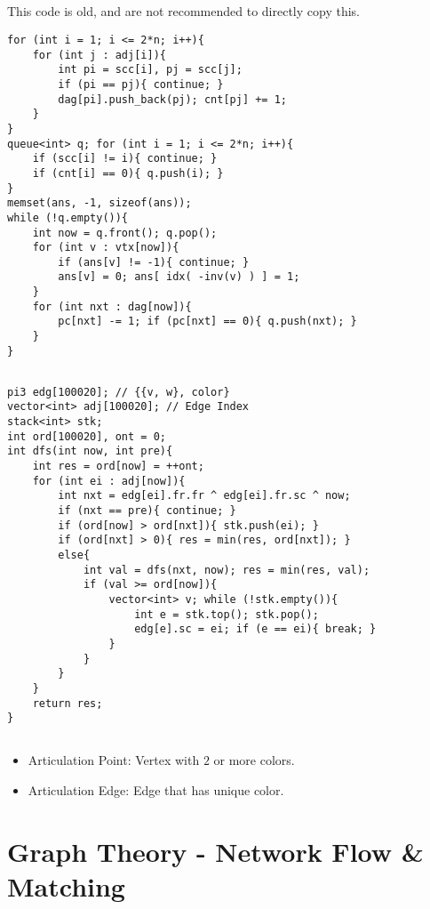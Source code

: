 \documentclass[landscape, 8pt, a4paper, oneside, twocolumn]{extarticle}
\begin{document}
\subsection{}
This code is old, and are not recommended to directly copy this.
\begin{verbatim}
for (int i = 1; i <= 2*n; i++){
    for (int j : adj[i]){
        int pi = scc[i], pj = scc[j];
        if (pi == pj){ continue; }
        dag[pi].push_back(pj); cnt[pj] += 1;
    }
}
queue<int> q; for (int i = 1; i <= 2*n; i++){
    if (scc[i] != i){ continue; }
    if (cnt[i] == 0){ q.push(i); }
}
memset(ans, -1, sizeof(ans));
while (!q.empty()){
    int now = q.front(); q.pop();
    for (int v : vtx[now]){
        if (ans[v] != -1){ continue; }
        ans[v] = 0; ans[ idx( -inv(v) ) ] = 1;
    }
    for (int nxt : dag[now]){
        pc[nxt] -= 1; if (pc[nxt] == 0){ q.push(nxt); }
    }
}
\end{verbatim}
\subsection{}
\begin{verbatim}
pi3 edg[100020]; // {{v, w}, color}
vector<int> adj[100020]; // Edge Index
stack<int> stk;
int ord[100020], ont = 0;
int dfs(int now, int pre){
    int res = ord[now] = ++ont;
    for (int ei : adj[now]){
        int nxt = edg[ei].fr.fr ^ edg[ei].fr.sc ^ now;
        if (nxt == pre){ continue; }
        if (ord[now] > ord[nxt]){ stk.push(ei); }
        if (ord[nxt] > 0){ res = min(res, ord[nxt]); }
        else{
            int val = dfs(nxt, now); res = min(res, val);
            if (val >= ord[now]){
                vector<int> v; while (!stk.empty()){
                    int e = stk.top(); stk.pop();
                    edg[e].sc = ei; if (e == ei){ break; }
                }
            }
        }
    }
    return res;
}
\end{verbatim}
\subsection{}
\begin{itemize}
	\item Articulation Point: Vertex with $2$ or more colors.
	\item Articulation Edge: Edge that has unique color.
\end{itemize}
\section{Graph Theory - Network Flow \& Matching}
\end{document}
